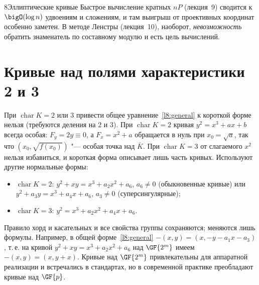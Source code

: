\begin{lecture}{8}{Эллиптические кривые}
Быстрое вычисление кратных $nP$ (лекция~9) сводится к $\bigO(\log n)$ удвоениям и сложениям,
и там выигрыш от проективных координат особенно заметен. В методе Ленстры (лекция~10), наоборот,
\emph{невозможность} обратить знаменатель по составному модулю и есть цель вычислений.

\section{Кривые над полями характеристики 2 и 3}\label{l8:char23}

При $\operatorname{char} K = 2$ или $3$ привести общее уравнение~\eqref{l8:general} к короткой
форме нельзя (требуются деления на $2$ и $3$). При $\operatorname{char} K = 2$ кривая
$y^2 = x^3 + ax + b$ всегда особая: $F_y = 2y \equiv 0$, а $F_x = x^2 + a$ обращается в нуль при
$x_0 = \sqrt a$, так что $(x_0, \sqrt{f(x_0)})$ "--- особая точка над $\overline K$. При
$\operatorname{char} K = 3$ от слагаемого $x^2$ нельзя избавиться, и короткая форма описывает
лишь часть кривых. Используют другие нормальные формы:
\begin{itemize}
  \item $\operatorname{char} K = 2$: $y^2 + xy = x^3 + a_2 x^2 + a_6$, $a_6 \ne 0$ (обыкновенные
    кривые) или $y^2 + a_3 y = x^3 + a_4 x + a_6$, $a_3 \ne 0$ (суперсингулярные);
  \item $\operatorname{char} K = 3$: $y^2 = x^3 + a_2 x^2 + a_4 x + a_6$.
\end{itemize}
Правило хорд и касательных и все свойства группы сохраняются; меняются лишь формулы. Например,
в общей форме~\eqref{l8:general} $-(x, y) = (x, -y - a_1 x - a_3)$, т.\,е. на кривой
$y^2 + xy = x^3 + a_2 x^2 + a_6$ над $\GF{2^m}$ имеем $-(x, y) = (x, y + x)$. Кривые над
$\GF{2^m}$ привлекательны для аппаратной реализации и встречались в стандартах, но в
современной практике преобладают кривые над $\GF{p}$.


\checkyourselfsection


\end{lecture}
